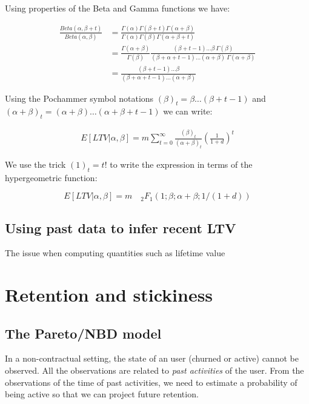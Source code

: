 \documentclass{tufte-book}
\begin{document}
Using properties of the Beta and Gamma functions we have:

\begin{align*}
  \frac{Beta(\alpha, \beta+t)}{Beta(\alpha, \beta)} &=
  \frac{\Gamma(\alpha)\Gamma(\beta+t)\Gamma(\alpha+\beta)}{\Gamma(\alpha)\Gamma(\beta)\Gamma(\alpha+\beta+t)}\\
  &= \frac{\Gamma(\alpha+\beta)}{\Gamma(\beta)}
  \frac{(\beta+t-1)\dots\beta\:\Gamma(\beta)}{(\beta+\alpha+t-1)\dots(\alpha+\beta)\:\Gamma(\alpha+\beta)}\\
  &= \frac{(\beta+t-1)\dots\beta}{(\beta+\alpha+t-1)\dots(\alpha+\beta)}
\end{align*}

Using the Pochammer symbol notations $(\beta)_t = \beta \dots (\beta+t-1)$ and $(\alpha+\beta)_t =
(\alpha+\beta) \dots (
\alpha+\beta+t-1)$ we can write:

\begin{align*}
  E\left[LTV|\alpha, \beta\right] = m \sum_{t=0}^{\infty} \frac{(\beta)_t}{\left(\alpha+\beta\right)_t}
  \left(\frac{1}{1+d}\right)^t
\end{align*}

We use the trick $(1)_t = t!$ to write the expression in terms of the hypergeometric function:

$$
E\left[LTV | \alpha, \beta\right] = m \quad _2F_1(1; \beta; \alpha+\beta; 1/(1+d))
$$

\subsection{Using past data to infer recent LTV}

The issue when computing quantities such as lifetime value
  
\section{Retention and stickiness}
\label{sec:retention_and_stickiness}

\subsection{The Pareto/NBD model}
\label{sub:the_pareto_nbd_model}
In a non-contractual setting, the state of an user (churned or active)
cannot be observed. All the observations are related to \emph{past
  activities} of the user. From the observations of the time of past
activities, we need to estimate a probability of being active so that
we can project future retention.
\end{document}
